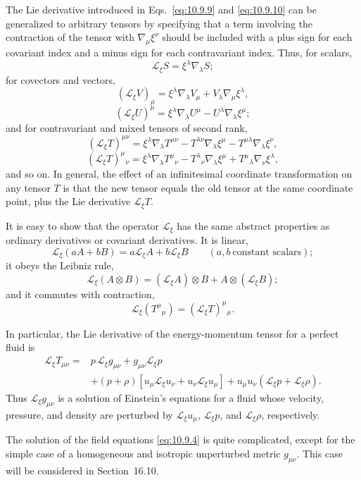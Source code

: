 The Lie derivative introduced in Eqs.~\eqref{eq:10.9.9} and
\eqref{eq:10.9.10} can be generalized to arbitrary tensors by specifying
that a term involving the contraction of the tensor with
\(\nabla_\mu\xi^\nu\) should be included with a plus sign for each covariant
index and a minus sign for each contravariant index. Thus, for scalars,
\[
  \mathcal L_\xi S=\xi^\lambda\nabla_\lambda S;
\]
for covectors and vectors,
\[
  (\mathcal L_\xi V)_\mu
  =
  \xi^\lambda\nabla_\lambda V_\mu
  +V_\lambda\nabla_\mu\xi^\lambda,
\]
\[
  (\mathcal L_\xi U)^\mu
  =
  \xi^\lambda\nabla_\lambda U^\mu
  -U^\lambda\nabla_\lambda\xi^\mu;
\]
and for contravariant and mixed tensors of second rank,
\[
  (\mathcal L_\xi T)^{\mu\nu}
  =
  \xi^\lambda\nabla_\lambda T^{\mu\nu}
  -T^{\lambda\nu}\nabla_\lambda\xi^\mu
  -T^{\mu\lambda}\nabla_\lambda\xi^\nu,
\]
\[
  (\mathcal L_\xi T)^\mu{}_\nu
  =
  \xi^\lambda\nabla_\lambda T^\mu{}_\nu
  -T^\lambda{}_\nu\nabla_\lambda\xi^\mu
  +T^\mu{}_\lambda\nabla_\nu\xi^\lambda,
\]
and so on. In general, the effect of an infinitesimal coordinate
transformation on any tensor \(T\) is that the new tensor equals the old
tensor at the same coordinate point, plus the Lie derivative
\(\mathcal L_\xi T\).

It is easy to show that the operator \(\mathcal L_\xi\) has the same abstract
properties as ordinary derivatives or covariant derivatives. It is linear,
\[
  \mathcal L_\xi(aA+bB)
  =
  a\mathcal L_\xi A+b\mathcal L_\xi B
  \qquad
  (a,b\ \text{constant scalars});
\]
it obeys the Leibniz rule,
\[
  \mathcal L_\xi(A\otimes B)
  =
  (\mathcal L_\xi A)\otimes B
  +A\otimes(\mathcal L_\xi B);
\]
and it commutes with contraction,
\[
  \mathcal L_\xi(T^\mu{}_\mu)
  =
  (\mathcal L_\xi T)^\mu{}_\mu.
\]

In particular, the Lie derivative of the energy-momentum tensor for a perfect
fluid is
\[
  \begin{split}
  \mathcal L_\xi T_{\mu\nu}
  ={}&
  p\,\mathcal L_\xi g_{\mu\nu}
  +g_{\mu\nu}\mathcal L_\xi p
  \\
  &+
  (p+\rho)
  \left[
    u_\mu\mathcal L_\xi u_\nu
    +u_\nu\mathcal L_\xi u_\mu
  \right]
  +u_\mu u_\nu
  \left(
    \mathcal L_\xi p+\mathcal L_\xi\rho
  \right).
  \end{split}
\]
Thus \(\mathcal L_\xi g_{\mu\nu}\) is a solution of Einstein's equations for
a fluid whose velocity, pressure, and density are perturbed by
\(\mathcal L_\xi u_\mu\), \(\mathcal L_\xi p\), and
\(\mathcal L_\xi\rho\), respectively.

The solution of the field equations \eqref{eq:10.9.4} is quite complicated,
except for the simple case of a homogeneous and isotropic unperturbed metric
\(g_{\mu\nu}\). This case will be considered in Section~16.10.
